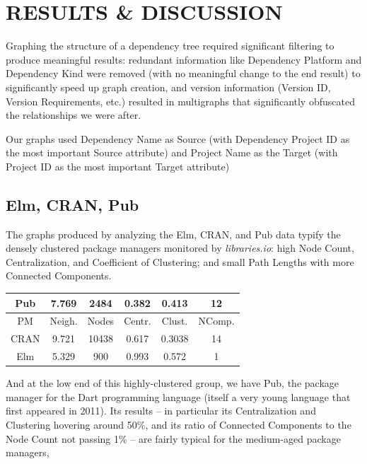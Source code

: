 \documentclass[letterpaper, 10 pt, conference]{ieeeconf}  %
\begin{document}
\section{RESULTS \& DISCUSSION}

Graphing the structure of a dependency tree required significant filtering to produce meaningful results:
	redundant information like Dependency Platform and Dependency Kind were removed 
	(with no meaningful change to the end result) to significantly speed up graph creation, 
    and version information (Version ID, Version Requirements, etc.) resulted in multigraphs 
	that significantly obfuscated the relationships we were after.

Our graphs used Dependency Name as Source (with Dependency Project ID as the most important Source attribute)
and Project Name as the Target (with Project ID as the most important Target attribute)


\subsection{Elm, CRAN, Pub}

The graphs produced by analyzing the Elm, CRAN, and Pub data 
	typify the densely clustered package managers monitored by \emph{libraries.io}:
	high Node Count, Centralization, and Coefficient of Clustering;
	and small Path Lengths with more Connected Components.

\begin{center}
\begin{tabular}{||c c c c c c ||} 
\hline
Pub & 7.769 & 2484 & 0.382 & 0.413 & 12  \\ 
\hline
PM & Neigh. & Nodes & Centr. & Clust. & NComp. \\ [0.5ex] 
\hline\hline
CRAN & 9.721 &	10438 & 0.617 & 0.3038 & 14 \\ 
\hline
Elm & 5.329 & 900 & 0.993 & 0.572 & 1 \\ [1ex] 
\hline
\end{tabular}
\end{center}

And at the low end of this highly-clustered group,
	we have Pub, the package manager for the Dart programming language 
    (itself a very young language that first appeared in 2011). 
    Its results -- in particular its Centralization and Clustering hovering around 50\%, 
    and its ratio of Connected Components to the Node Count not passing 1\% -- 
    are fairly typical for the medium-aged package managers,
\end{document}

